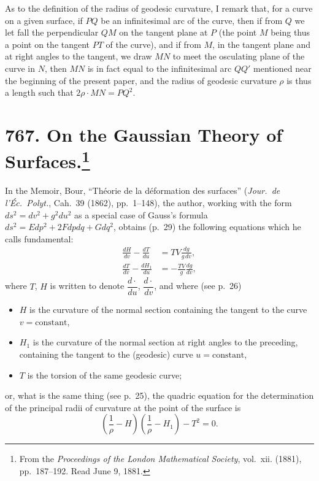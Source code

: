 \documentclass[11pt,a4paper]{book}
\begin{document}
As to the definition of the radius of geodesic curvature, I remark that, for a curve on a given surface, if $PQ$ be an infinitesimal arc of the curve, then if from $Q$ we let fall the perpendicular $QM$ on the tangent plane at $P$ (the point $M$ being thus a point on the tangent $PT$ of the curve), and if from $M$, in the tangent plane and at right angles to the tangent, we draw $MN$ to meet the osculating plane of the curve in $N$, then $MN$ is in fact equal to the infinitesimal arc $QQ'$ mentioned near the beginning of the present paper, and the radius of geodesic curvature $\rho$ is thus a length such that $2\rho \cdot MN = PQ^2$.

\newpage
\section[On the Gaussian Theory of Surfaces]{767. On the Gaussian Theory of Surfaces.\footnote{From the \textit{Proceedings of the London Mathematical Society}, vol.~xii. (1881), pp.~187--192. Read June 9, 1881.}}

In the Memoir, Bour, ``Th\'eorie de la d\'eformation des surfaces'' (\textit{Jour.~de l'\'Ec.~Polyt.}, Cah.~39 (1862), pp.~1--148), the author, working with the form $ds^2 = dv^2 + g^2 du^2$ as a special case of Gauss's formula $ds^2 = Edp^2 + 2Fdpdq + Gdq^2$, obtains (p.~29) the following equations which he calls fundamental:
\[
\begin{aligned}
\frac{dH}{dv} - \frac{dT}{du} &= TV \frac{dg}{g\,dv},\\
\frac{dT}{dv} - \frac{dH_1}{du} &= -\frac{TV}{g} \frac{dg}{dv},
\end{aligned}
\tag{IV.}
\]
where $T$, $H$ is written to denote $\dfrac{d\cdot}{du}$, $\dfrac{d\cdot}{dv}$, and where (see p.~26)
\begin{itemize}[noitemsep]
\item $H$ is the curvature of the normal section containing the tangent to the curve $v = \text{constant}$,
\item $H_1$ is the curvature of the normal section at right angles to the preceding, containing the tangent to the (geodesic) curve $u = \text{constant}$,
\item $T$ is the torsion of the same geodesic curve;
\end{itemize}
or, what is the same thing (see p.~25), the quadric equation for the determination of the principal radii of curvature at the point of the surface is
\[
\left(\frac{1}{\rho} - H\right)\left(\frac{1}{\rho} - H_1\right) - T^2 = 0.
\]
\end{document}
